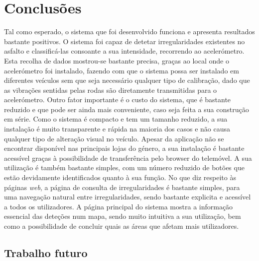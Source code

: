 \chapter{Conclusões}
\label{cha:conclusoes}

Tal como esperado, o sistema que foi desenvolvido funciona e apresenta resultados bastante positivos.
O sistema foi capaz de detetar irregularidades existentes no asfalto e classificá-las consoante a sua intensidade, recorrendo ao acelerómetro.
Esta recolha de dados mostrou-se bastante precisa, graças ao local onde o acelerómetro foi instalado, fazendo com que o sistema possa ser instalado em diferentes veículos sem que seja necessário qualquer tipo de calibração, dado que as vibrações sentidas pelas rodas são diretamente transmitidas para o acelerómetro.
Outro fator importante é o custo do sistema, que é bastante reduzido e que pode ser ainda mais conveniente, caso seja feita a sua construção em série.
Como o sistema é compacto e tem um tamanho reduzido, a sua instalação é muito transparente e rápida na maioria dos casos e não causa qualquer tipo de alteração visual no veículo.
Apesar da aplicação não se encontrar disponível nas principais lojas do género, a sua instalação é bastante acessível graças à possibilidade de transferência pelo browser do telemóvel.
A sua utilização é também bastante simples, com um número reduzido de botões que estão devidamente identificados quanto à sua função.
No que diz respeito às páginas \emph{web}, a página de consulta de irregularidades é bastante simples, para uma navegação natural entre irregularidades, sendo bastante explicita e acessível a todos os utilizadores.
A página principal do sistema mostra a informação essencial das deteções num mapa, sendo muito intuitiva a sua utilização, bem como a possibilidade de concluir quais as áreas que afetam mais utilizadores.

\section{Trabalho futuro}
\label{sec:trabalho_futuro}

